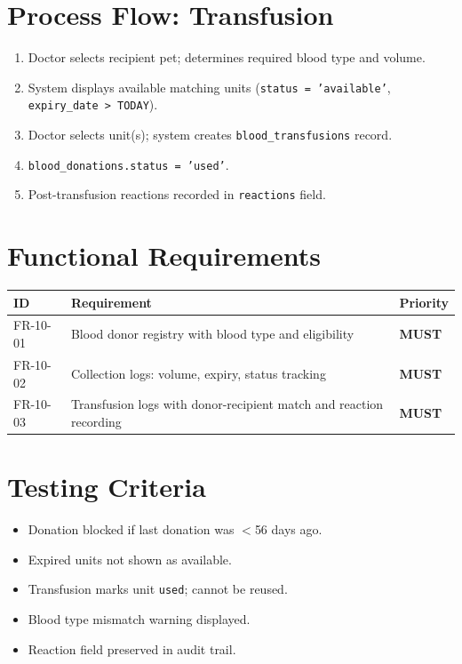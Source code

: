 \documentclass[12pt,a4paper]{report}
\newcommand{\must}{\colorbox{red!15}{\color{errorred}\textbf{\small MUST}}}
\newcommand{\testcheck}{\textcolor{successgreen}{\ding{51}}}
\begin{document}
\section{Process Flow: Transfusion}

\begin{enumerate}
  \item Doctor selects recipient pet; determines required blood type and volume.
  \item System displays available matching units (\texttt{status = 'available'}, \texttt{expiry\_date > TODAY}).
  \item Doctor selects unit(s); system creates \texttt{blood\_transfusions} record.
  \item \texttt{blood\_donations.status = 'used'}.
  \item Post-transfusion reactions recorded in \texttt{reactions} field.
\end{enumerate}

\section{Functional Requirements}

\begin{longtable}{L{2.5cm} L{9cm} C{2cm}}
\toprule
\textbf{ID} & \textbf{Requirement} & \textbf{Priority} \\\midrule\endhead\bottomrule\endfoot
FR-10-01 & Blood donor registry with blood type and eligibility & \must \\
FR-10-02 & Collection logs: volume, expiry, status tracking & \must \\
FR-10-03 & Transfusion logs with donor-recipient match and reaction recording & \must \\
\end{longtable}

\section{Testing Criteria}

\begin{itemize}
  \item[\testcheck] Donation blocked if last donation was $<$56 days ago.
  \item[\testcheck] Expired units not shown as available.
  \item[\testcheck] Transfusion marks unit \texttt{used}; cannot be reused.
  \item[\testcheck] Blood type mismatch warning displayed.
  \item[\testcheck] Reaction field preserved in audit trail.
\end{itemize}
\end{document}

